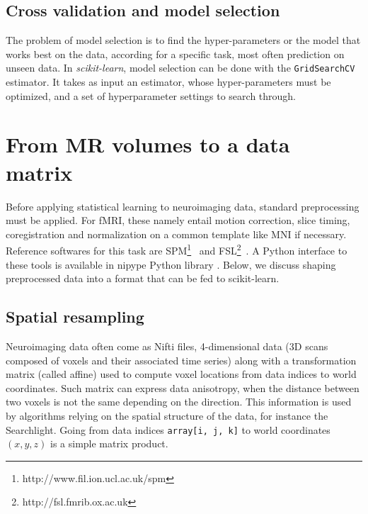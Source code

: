 \documentclass{frontiersSCNS} %
\begin{document}
\subsection{Cross validation and model selection}


The problem of model selection is to find the hyper-parameters or the
model that works best on the data, according for a specific task, most
often prediction on unseen data.
%
In {\em scikit-learn}, model selection can be done with the
\texttt{GridSearchCV} estimator. It takes as input an estimator, whose
hyper-parameters must be optimized, and a set of hyperparameter settings
to search through. 

\section{From MR volumes to a data matrix}

Before applying statistical learning to neuroimaging data, standard
preprocessing must be applied. For fMRI, these namely entail motion
correction, slice timing, coregistration and normalization on a common
template like MNI if necessary. Reference softwares for this task are
SPM\footnote{http://www.fil.ion.ucl.ac.uk/spm}~\citep{friston2007} and
FSL\footnote{http://fsl.fmrib.ox.ac.uk}~\citep{smith2004}. A Python
interface to these tools is available in nipype Python library
\citep{gorgolewski2011}. Below, we discuss shaping preprocessed data into
a format that can be fed to scikit-learn.

\subsection{Spatial resampling}
\label{resampling}

Neuroimaging data often come as Nifti files, 4-dimensional data (3D scans
composed of voxels and their associated time series) along with a
transformation matrix (called affine) used to compute voxel locations
from data indices to world coordinates. Such matrix can express data
anisotropy, when the distance between two voxels is not the same
depending on the direction. This information is used by algorithms
relying on the spatial structure of the data, for instance the
Searchlight. Going from data indices \verb!array[i, j, k]! to world
coordinates $(x, y, z)$ is a simple matrix product.

\end{document}
